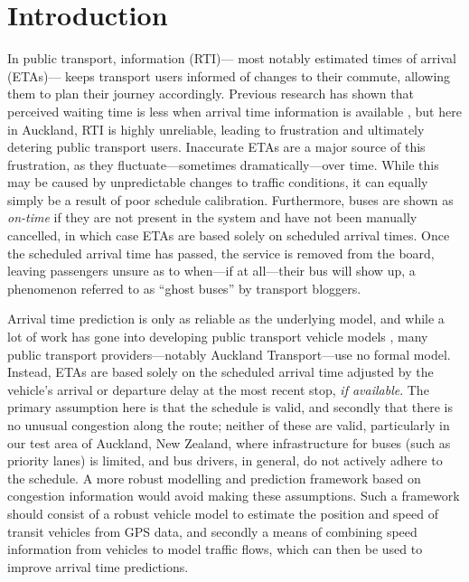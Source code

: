 \section{Introduction}
\label{sec:intro}


In public transport, \rt information (RTI)---%
most notably estimated times of arrival (ETAs)---%
keeps transport users informed of changes to their commute,
allowing them to plan their journey accordingly.
Previous research has shown that perceived waiting time is less
when arrival time information is available \citep{TCRP_2003b},
but here in Auckland, RTI is highly unreliable,
leading to frustration and ultimately detering public transport users.
Inaccurate ETAs are a major source of this frustration,
as they fluctuate---sometimes dramatically---over time.
While this may be caused by unpredictable changes to traffic conditions,
it can equally simply be a result of poor schedule calibration.
Furthermore, buses are shown as \emph{on-time} 
if they are not present in the \rt system and have not been manually cancelled,
in which case ETAs are based solely on scheduled arrival times.
Once the scheduled arrival time has passed,
the service is removed from the \rt board,
leaving passengers unsure as to when---if at all---their bus will show up,
a phenomenon referred to as ``ghost buses'' by transport bloggers.


Arrival time prediction is only as reliable as the underlying model,
and while a lot of work has gone into developing public transport vehicle models
\citep{Cathey_2003,Jeong_2005,Yu_2011,Hans_2015},
many public transport providers---notably Auckland Transport---use no formal model.
Instead, ETAs are based solely on the scheduled arrival time
adjusted by the vehicle's arrival or departure delay at the most recent stop, 
\emph{if available}.
The primary assumption here is that the schedule is valid,
and secondly that there is no unusual congestion along the route;
neither of these are valid,
particularly in our test area of Auckland, New Zealand,
where infrastructure for buses (such as priority lanes) is limited,
and bus drivers, in general, 
do not actively adhere to the schedule.
A more robust modelling and prediction framework 
based on \rt congestion information would avoid making these assumptions.
Such a framework should consist of a robust vehicle model to estimate the position and speed
of transit vehicles from \rt GPS data,
and secondly a means of combining speed information from vehicles
to model traffic flows,
which can then be used to improve arrival time predictions.


